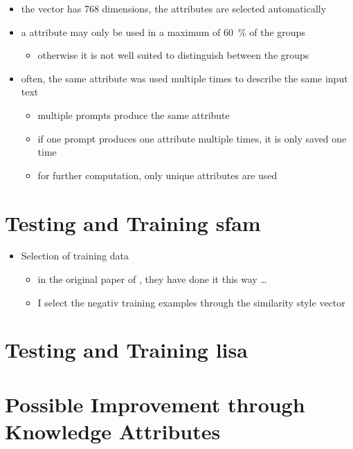 \begin{itemize}
  \item the vector has 768 dimensions, the attributes are selected automatically
  \item a attribute may only be used in a maximum of \SI{60}{\percent} of the groups
        \begin{itemize}
          \item otherwise it is not well suited to distinguish between the groups
        \end{itemize}
  \item often, the same attribute was used multiple times to describe the same input text
        \begin{itemize}
          \item multiple prompts produce the same attribute
          \item if one prompt produces one attribute multiple times, it is only saved one time
          \item for further computation, only unique attributes are used
        \end{itemize}
\end{itemize}


\section{Testing and Training \acs{sfam}}
\label{sec:approach:sfam}

\begin{itemize}
  \item Selection of training data
        \begin{itemize}
          \item in the original paper of \textcite{patelLearningInterpretableStyle2023}, they have done it this way \ldots
          \item I select the negativ training examples through the similarity style vector
        \end{itemize}
\end{itemize}


\section{Testing and Training \acs{lisa}}
\label{sec:approach:lisa}


\section{Possible Improvement through Knowledge Attributes}
\label{sec:approach:knowledge_attributes}



